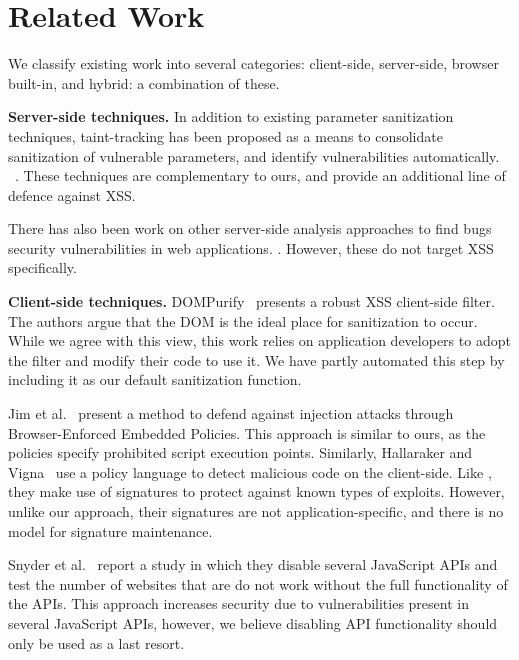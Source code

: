 \section{Related Work}
We classify existing work into several categories: client-side, server-side, browser built-in, and hybrid: a combination of these.

\noindent \textbf{Server-side techniques.}
In addition to existing parameter sanitization techniques,
taint-tracking has been proposed as a means to consolidate
sanitization of vulnerable parameters, and identify vulnerabilities automatically. ~\cite{10.1145/1368088.1368112, Xu:2006:TPE:1267336.1267345,DBLP:conf/sec/Nguyen-TuongGGSE05,Pietraszek:2005:DAI:2146257.2146267,Bisht:2008:XPD:1428322.1428325, 5070521}. These techniques are complementary to ours, and provide an additional line
of defence against \ac{XSS}.

There has also been work on other server-side analysis approaches
to find bugs security vulnerabilities in web applications. \cite{10.1145/1390630.1390661, 5416728, 10.1145/2393596.2393608}.
However, these do not target XSS specifically.

\noindent \textbf{Client-side techniques.}
DOMPurify~\cite{10.1007/978-3-319-66399-9_7} presents a robust
\ac{XSS} client-side filter. The authors
argue that the DOM is the ideal place for sanitization to occur. While
we agree with this view, this work relies on application developers
to adopt the filter and modify their code to use it. We have partly automated this step by including it as our default sanitization function.

Jim et al.~\cite{Jim:2007:DSI:1242572.1242654} present a method to
defend against injection attacks through Browser-Enforced Embedded
Policies. This approach is similar to ours, as the policies specify
prohibited script execution points. Similarly, Hallaraker and Vigna~\cite{Hallaraker:2005:DMJ:1078029.1078861} use a
policy language to detect malicious code on the client-side. Like \sys, they make use of signatures to protect against known types of
exploits. However, unlike our approach, their signatures are not
application-specific, and there is no model for signature
maintenance.

Snyder et al.~\cite{Snyder:2017:MWD:3133956.3133966} report a study in which
they disable several JavaScript APIs and test the number of websites
that are do not work without the full functionality of the APIs. This approach increases security due to vulnerabilities present in several
JavaScript APIs, however, we believe disabling API functionality
should only be used as a last resort.

